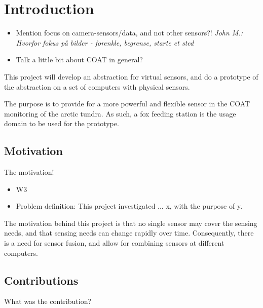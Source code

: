 \documentclass[USenglish]{uit-thesis}
\begin{document}
\tableofcontents

\listoffigures

\mainmatter

\chapter{Introduction}
\begin{itemize}
\item Mention focus on camera-sensors/data, and not other sensors?!
\textit{John M.: Hvorfor fokus på bilder - forenkle, begrense, starte et sted}
\item Talk a little bit about COAT in general?
\end{itemize}

This project will develop an abstraction for virtual sensors, and do a prototype of the abstraction on a set of computers with physical sensors.

The purpose is to provide for a more powerful and flexible sensor in the COAT monitoring of the arctic tundra. As such, a fox feeding station is the usage domain to be used for the prototype.





\section{Motivation}
The motivation!
\begin{itemize}
\item W3
\item Problem definition: This project investigated ... x, with the purpose of y.
\end{itemize}

The motivation  behind this project is that no single sensor may cover the sensing needs, and that sensing needs can change rapidly over time. Consequently, there is a need for sensor fusion, and allow for combining sensors at different computers.

\section{Contributions}
What was the contribution?
\end{document}
